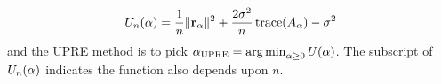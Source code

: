 \begin{equation}
\label{eq:UPRE}
U_n(\alpha) = \frac{1}{n}\|\mathbf{r}_{\alpha}\|^2 + \frac{2\sigma^2}{n}\operatorname{trace}(A_{\alpha}) - \sigma^2
\end{equation}
and the UPRE method is to pick $\alpha_{\text{UPRE}} = \operatorname*{arg\,min}_{\alpha \geq 0} U(\alpha)$. The subscript of $U_n(\alpha)$ indicates the function also depends upon $n$. \par

